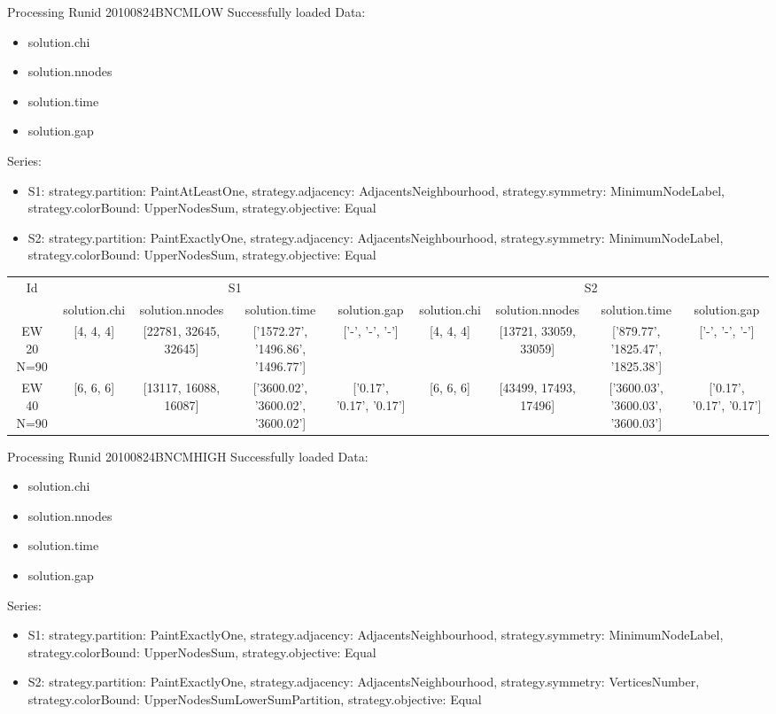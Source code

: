\documentclass[landscape, 12pt]{report}
\begin{document}
Processing Runid 20100824BNCMLOW
 Successfully loaded
Data:
\begin{itemize}
\item solution.chi
\item solution.nnodes
\item solution.time
\item solution.gap
\end{itemize}
Series:
\begin{itemize}
\item S1: strategy.partition: PaintAtLeastOne, strategy.adjacency: AdjacentsNeighbourhood, strategy.symmetry: MinimumNodeLabel, strategy.colorBound: UpperNodesSum, strategy.objective: Equal
\item S2: strategy.partition: PaintExactlyOne, strategy.adjacency: AdjacentsNeighbourhood, strategy.symmetry: MinimumNodeLabel, strategy.colorBound: UpperNodesSum, strategy.objective: Equal
\end{itemize}
\begin{tabular}{|c|cccc|cccc|}
\hline
\multicolumn{1}{|c|}{Id} & \multicolumn{4}{|c|}{S1} & \multicolumn{4}{|c|}{S2}
\\
 & solution.chi & solution.nnodes & solution.time & solution.gap & solution.chi & solution.nnodes & solution.time & solution.gap
\\
\hline
EW 20 N=90 & [4, 4, 4] & [22781, 32645, 32645] & ['1572.27', '1496.86', '1496.77'] & ['-', '-', '-'] & [4, 4, 4] & [13721, 33059, 33059] & ['879.77', '1825.47', '1825.38'] & ['-', '-', '-']
\\
EW 40 N=90 & [6, 6, 6] & [13117, 16088, 16087] & ['3600.02', '3600.02', '3600.02'] & ['0.17', '0.17', '0.17'] & [6, 6, 6] & [43499, 17493, 17496] & ['3600.03', '3600.03', '3600.03'] & ['0.17', '0.17', '0.17']
\\
\hline 
 \end{tabular}
Processing Runid 20100824BNCMHIGH
 Successfully loaded
Data:
\begin{itemize}
\item solution.chi
\item solution.nnodes
\item solution.time
\item solution.gap
\end{itemize}
Series:
\begin{itemize}
\item S1: strategy.partition: PaintExactlyOne, strategy.adjacency: AdjacentsNeighbourhood, strategy.symmetry: MinimumNodeLabel, strategy.colorBound: UpperNodesSum, strategy.objective: Equal
\item S2: strategy.partition: PaintExactlyOne, strategy.adjacency: AdjacentsNeighbourhood, strategy.symmetry: VerticesNumber, strategy.colorBound: UpperNodesSumLowerSumPartition, strategy.objective: Equal
\end{itemize}
\end{document}
